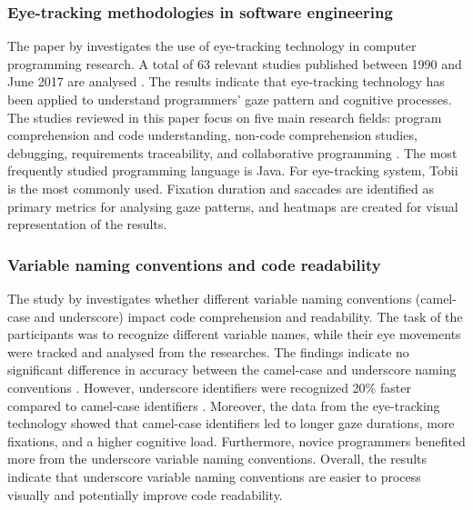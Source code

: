 \subsubsection{Eye-tracking methodologies in software engineering}
The paper by \citet{obaidellah2018survey} investigates the use of eye-tracking technology in computer programming research. A total of 63 relevant studies published between 1990 and June 2017 are analysed \cite{obaidellah2018survey}. The results indicate that eye-tracking technology has been applied to understand programmers' gaze pattern and cognitive processes. The studies reviewed in this paper focus on five main research fields: program comprehension and code understanding, non-code comprehension studies, debugging, requirements traceability, and collaborative programming \cite{obaidellah2018survey}.  The most frequently studied programming language is Java.  
For eye-tracking system, Tobii is the most commonly used.  Fixation duration and saccades are identified as primary metrics for analysing gaze patterns, and heatmaps are created for visual representation of the results.


\subsubsection{Variable naming conventions and code readability}

The study by \citet{sharif2010eye} investigates whether different variable naming conventions (camel-case and underscore) impact code comprehension and readability.
The task of the participants was to recognize different variable names, while their eye movements were tracked and analysed from the researches. 
The findings indicate no significant difference in accuracy between the camel-case and underscore naming conventions \cite{sharif2010eye}. However, underscore identifiers were recognized 20\% faster compared to camel-case identifiers \cite{sharif2010eye}. Moreover, the data from the eye-tracking technology showed that camel-case identifiers led to longer gaze durations, more fixations, and a   higher cognitive load. Furthermore, novice programmers benefited more from the underscore variable naming conventions.   
Overall, the results indicate that underscore variable naming conventions are easier to process visually and potentially improve code readability.   


